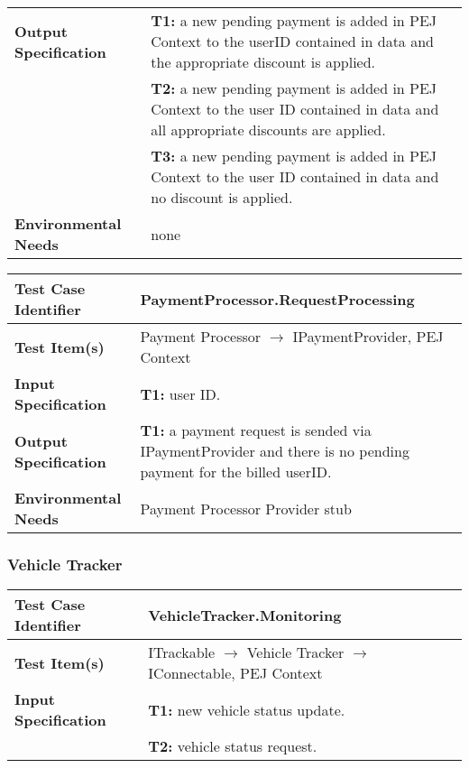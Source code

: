 {\begin{tabularx}{\textwidth}{l X}
    \textbf{Output Specification} & \textbf{T1:} a new pending payment is added in PEJ Context to the userID contained in data and the appropriate discount is applied.\\
    & \textbf{T2:} a new pending payment is added in PEJ Context to the user ID contained in data and all appropriate discounts are applied.\\
    & \textbf{T3:} a new pending payment is added in PEJ Context to the user ID contained in data and no discount is applied.\\
    \hline 
    
    \textbf{Environmental Needs} & none\\
    \hline
\end{tabularx}
\bigskip 

\noindent
\begin{tabularx}{\textwidth}{l X}
    \hline 
    \textbf{Test Case Identifier} & PaymentProcessor.RequestProcessing\\ 
    \hline 
    
    \textbf{Test Item(s)} & Payment Processor $\rightarrow$ IPaymentProvider, PEJ Context\\
    \hline 
    
    \textbf{Input Specification} & \textbf{T1:} user ID.\\
    \hline 
    
    \textbf{Output Specification} & \textbf{T1:} a payment request is sended via IPaymentProvider and there is no pending payment for the billed userID.\\
    \hline 
    
    \textbf{Environmental Needs} & Payment Processor Provider stub\\
    \hline
\end{tabularx}

\noindent 
\subsubsection{Vehicle Tracker}
\begin{tabularx}{\textwidth}{l X}
    \hline 
    \textbf{Test Case Identifier} & VehicleTracker.Monitoring\\ 
    \hline 
    
    \textbf{Test Item(s)} & ITrackable $\rightarrow$ Vehicle Tracker $\rightarrow$ IConnectable, PEJ Context\\
    \hline 
    
    \textbf{Input Specification} & \textbf{T1:} new vehicle status update.\\
                                & \textbf{T2:} vehicle status request.\\
    \hline 
    

\end{tabularx}}
